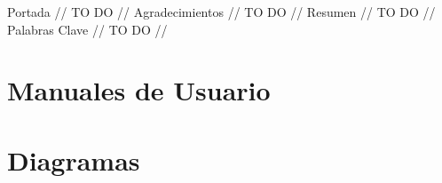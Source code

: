 \documentclass[a4paper,12pt,twoside]{book}
\begin{document}
\pagestyle{empty}
Portada
// TO DO //
\newpage
Agradecimientos
// TO DO //
\newpage
Resumen
// TO DO //
\newpage
Palabras Clave
// TO DO //
\newpage

\setcounter{page}{1}
\cleardoublepage
\tableofcontents
\cleardoublepage
\listoffigures
\cleardoublepage
\listoftables
























\appendix
\chapter{Manuales de Usuario}


\chapter{Diagramas}
\end{document}
